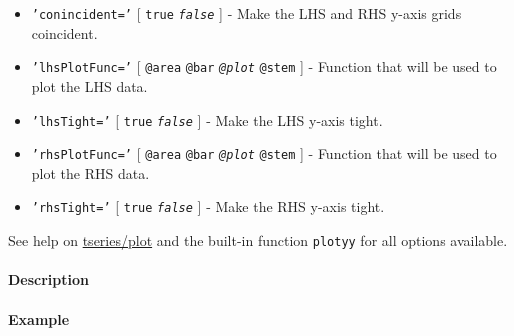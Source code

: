  \begin{itemize}
 \item
   \texttt{'conincident='} {[} \texttt{true} \textbar{}
   \emph{\texttt{false}} {]} - Make the LHS and RHS y-axis grids
   coincident.
 \item
   \texttt{'lhsPlotFunc='} {[} \texttt{@area} \textbar{} \texttt{@bar}
   \textbar{} \emph{\texttt{@plot}} \textbar{} \texttt{@stem} {]} -
   Function that will be used to plot the LHS data.
 \item
   \texttt{'lhsTight='} {[} \texttt{true} \textbar{}
   \emph{\texttt{false}} {]} - Make the LHS y-axis tight.
 \item
   \texttt{'rhsPlotFunc='} {[} \texttt{@area} \textbar{} \texttt{@bar}
   \textbar{} \emph{\texttt{@plot}} \textbar{} \texttt{@stem} {]} -
   Function that will be used to plot the RHS data.
 \item
   \texttt{'rhsTight='} {[} \texttt{true} \textbar{}
   \emph{\texttt{false}} {]} - Make the RHS y-axis tight.
 \end{itemize}
 
 See help on \url{tseries/plot} and the built-in function \texttt{plotyy}
 for all options available.
 
 \paragraph{Description}
 
 \paragraph{Example}


